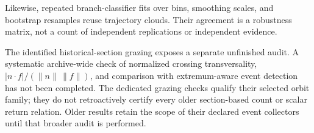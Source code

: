 Likewise, repeated branch-classifier fits over bins, smoothing scales, and
bootstrap resamples reuse trajectory clouds. Their agreement is a robustness
matrix, not a count of independent replications or independent evidence.

The identified historical-section grazing exposes a separate unfinished audit.
A systematic archive-wide check of normalized crossing transversality,
$|n\!\cdot f|/(\|n\|\,\|f\|)$, and comparison with extremum-aware event detection
has not been completed. The dedicated grazing checks qualify their selected
orbit family; they do not retroactively certify every older section-based
count or scalar return relation. Older results retain the scope of their
declared event collectors until that broader audit is performed.
